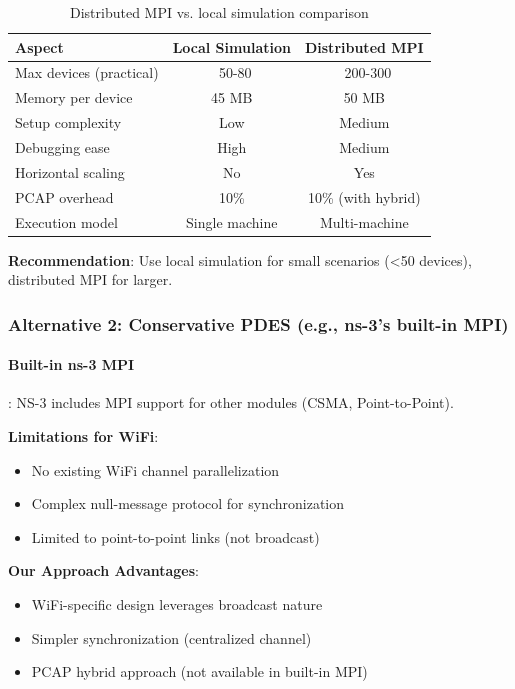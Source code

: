 \begin{table}[htbp]
\centering
\caption{Distributed MPI vs. local simulation comparison}
\label{tab:mpi-vs-local}
\begin{tabular}{@{}lcc@{}}
\toprule
\textbf{Aspect} & \textbf{Local Simulation} & \textbf{Distributed MPI} \\
\midrule
Max devices (practical) & ~50-80 & ~200-300 \\
Memory per device & 45 MB & 50 MB \\
Setup complexity & Low & Medium \\
Debugging ease & High & Medium \\
Horizontal scaling & No & Yes \\
PCAP overhead & 10\% & 10\% (with hybrid) \\
Execution model & Single machine & Multi-machine \\
\bottomrule
\end{tabular}
\end{table}

\textbf{Recommendation}: Use local simulation for small scenarios (<50 devices), distributed MPI for larger.

\subsubsection{Alternative 2: Conservative PDES (e.g., ns-3's built-in MPI)}

\paragraph{Built-in ns-3 MPI}:
NS-3 includes MPI support for other modules (CSMA, Point-to-Point).

\textbf{Limitations for WiFi}:
\begin{itemize}
    \item No existing WiFi channel parallelization
    \item Complex null-message protocol for synchronization
    \item Limited to point-to-point links (not broadcast)
\end{itemize}

\textbf{Our Approach Advantages}:
\begin{itemize}
    \item WiFi-specific design leverages broadcast nature
    \item Simpler synchronization (centralized channel)
    \item PCAP hybrid approach (not available in built-in MPI)
\end{itemize}

